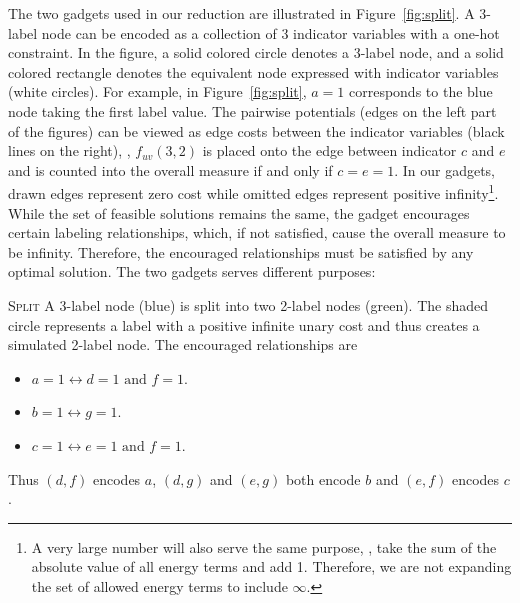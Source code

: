 
%

% 
The two gadgets used in our reduction are illustrated in Figure~\ref{fig:split}. A 3-label node can be encoded as a collection of 3 indicator variables with a one-hot constraint. In the figure, a solid colored circle denotes a 3-label node, and a solid colored rectangle denotes the equivalent node expressed with indicator variables (white circles).  For example, in Figure~\ref{fig:split}, $a=1$ corresponds to the blue node taking the first label value. The pairwise potentials (edges on the left part of the figures) can be viewed as edge costs between the indicator variables (black lines on the right), \eg, $f_{uv}(3, 2)$ is placed onto the edge between indicator $c$ and $e$ and is counted into the overall measure if and only if $c = e = 1$. In our gadgets, drawn edges represent zero cost while omitted edges represent positive infinity\footnote{A very large number will also serve the same purpose, \eg, take the sum of the absolute value of all energy terms and add 1. Therefore, we are not expanding the set of allowed energy terms to include $\infty$.}.  While the set of feasible solutions remains the same, the gadget encourages certain labeling relationships, which, if not satisfied, cause the overall measure to be infinity. Therefore, the encouraged relationships must be satisfied by any optimal solution. The two gadgets serves different purposes:

\textsc{Split} A 3-label node (blue) is split into two 2-label nodes (green). The shaded circle represents a label with a positive infinite unary cost and thus creates a simulated 2-label node. The encouraged relationships are
\begin{itemize}
    \item $a = 1 \leftrightarrow d = 1 \text{ and } f = 1$.
    \item $b = 1 \leftrightarrow g = 1$.
    \item $c = 1 \leftrightarrow e = 1 \text{ and } f = 1$.
\end{itemize}
Thus $(d,f)$ encodes $a$, $(d,g)$ and $(e,g)$ both encode $b$ and $(e,f)$ encodes $c$.

